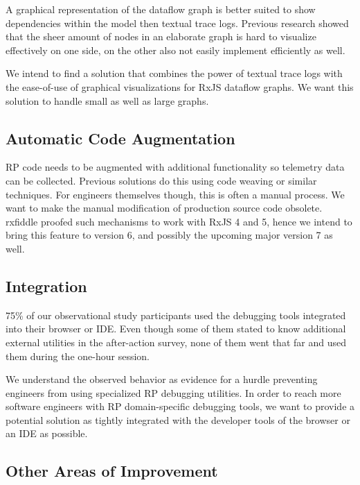 \documentclass[12pt,a4paper]{article}
\begin{document}
A graphical representation of the dataflow graph is better suited to show dependencies within the model then textual trace logs. Previous research showed that the sheer amount of nodes in an elaborate graph is hard to visualize effectively \cite{10.1145/3180155.3180156} on one side, on the other also not easily implement efficiently as well.

We intend to find a solution that combines the power of textual trace logs with the ease-of-use of graphical visualizations for RxJS dataflow graphs. We want this solution to handle small as well as large graphs.

\subsection{Automatic Code Augmentation}

RP code needs to be augmented with additional functionality so telemetry data can be collected. Previous solutions do this using code weaving\cite{10.1145/2884781.2884815} or similar techniques\cite{10.1145/3180155.3180156}. For engineers themselves though, this is often a manual process. We want to make the manual modification of production source code obsolete. rxfiddle proofed such mechanisms to work with RxJS 4 and 5, hence we intend to bring this feature to version 6, and possibly the upcoming major version 7 as well.

\subsection{Integration}

75\% of our observational study participants used the debugging tools integrated into their browser or IDE. Even though some of them stated to know additional external utilities in the after-action survey, none of them went that far and used them during the one-hour session.

We understand the observed behavior as evidence for a hurdle preventing engineers from using specialized RP debugging utilities. In order to reach more software engineers with RP domain-specific debugging tools, we want to provide a potential solution as tightly integrated with the developer tools of the browser or an IDE as possible.

\subsection{Other Areas of Improvement}
\end{document}
